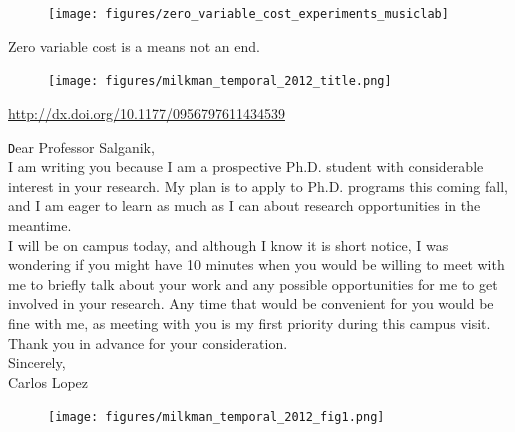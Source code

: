 \documentclass[aspectratio=169]{beamer}
\begin{document}
\begin{frame}

\begin{figure}
  \centering
  \texttt{[image: figures/zero\_variable\_cost\_experiments\_musiclab]}
\end{figure}

\vfill
\pause
\Large{Zero variable cost is a means not an end.}

\end{frame}
\begin{frame}

\begin{figure}
  \centering
  \texttt{[image: figures/milkman\_temporal\_2012\_title.png]}
\end{figure}

\vfill
\tiny{\url{http://dx.doi.org/10.1177/0956797611434539}}

\end{frame}
\begin{frame}

{\texttt
Dear Professor Salganik,\\ 

I am writing you because I am a prospective Ph.D. student with considerable interest in your research. My plan is to apply to Ph.D. programs this coming fall, and I am eager to learn as much as I can about research opportunities in the meantime.\\

I will be on campus today, and although I know it is short notice, I was wondering if you might have 10 minutes when you would be willing to meet with me to briefly talk about your work and any possible opportunities for me to get involved in your research. Any time that would be convenient for you would be fine with me, as meeting with you is my first priority during this campus visit.\\

Thank you in advance for your consideration.\\

Sincerely,\\
Carlos Lopez
}

\end{frame}
\begin{frame}

\begin{figure}
  \centering
  \texttt{[image: figures/milkman\_temporal\_2012\_fig1.png]}
\end{figure}

\end{frame}
\end{document}
